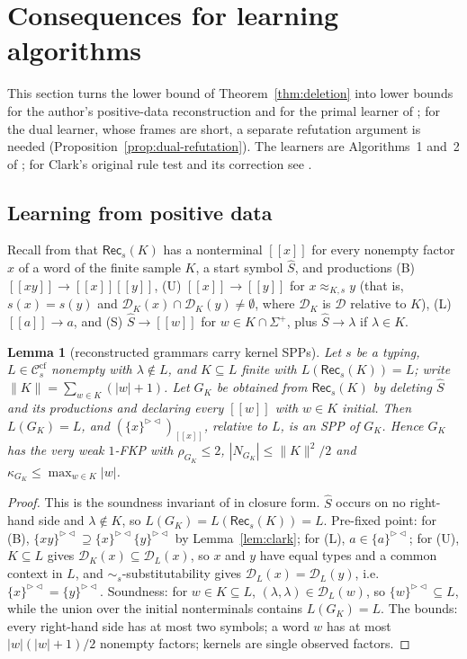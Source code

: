 \documentclass[11pt]{article}
\numberwithin{equation}{section}
\theoremstyle{plain}
\newtheorem{lemma}[theorem]{Lemma}
\theoremstyle{definition}
\theoremstyle{remark}
\theoremstyle{plain}
\newcommand{\eps}{\lambda}
\newcommand{\RL}{^{\rhd\lhd}}
\newcommand{\D}{\mathcal D}
\newcommand{\Ccf}[1]{\mathcal C^{\mathrm{cf}}_{#1}}
\begin{document}
\section{Consequences for learning algorithms}\label{sec:applications}

This section turns the lower bound of Theorem~\ref{thm:deletion} into lower
bounds for the author's positive-data reconstruction and for the primal
learner of \citet{ky2017}; for the dual learner, whose frames are short, a
separate refutation argument is needed (Proposition~\ref{prop:dual-refutation}).
The learners are Algorithms~1 and~2 of \citet{ky2017}; for Clark's original
rule test and its correction see \citet{leiss2014}.

\subsection*{Learning from positive data}

Recall from \citet[Sec.~4.1]{kuriyama-tcs1}
that $\mathsf{Rec}_s(K)$ has a nonterminal $[\![x]\!]$ for every nonempty
factor $x$ of a word of the finite sample $K$, a start symbol $\widehat S$,
and productions
(B) $[\![xy]\!]\to[\![x]\!][\![y]\!]$,
(U) $[\![x]\!]\to[\![y]\!]$ for $x\approx_{K,s}y$ (that is, $s(x)=s(y)$ and
$\D_K(x)\cap\D_K(y)\ne\emptyset$, where $\D_K$ is $\D$ relative to $K$),
(L) $[\![a]\!]\to a$, and
(S) $\widehat S\to[\![w]\!]$ for $w\in K\cap\Sigma^+$, plus
$\widehat S\to\eps$ if $\eps\in K$.

\begin{lemma}[reconstructed grammars carry kernel SPPs]\label{lem:rec-kernel}
Let $s$ be a typing, $L\in\Ccf s$ nonempty with $\eps\notin L$, and
$K\subseteq L$ finite with $L(\mathsf{Rec}_s(K))=L$; write
$\|K\|=\sum_{w\in K}(|w|+1)$.  Let $G_K$ be obtained from
$\mathsf{Rec}_s(K)$ by deleting $\widehat S$ and its productions and
declaring every $[\![w]\!]$ with $w\in K$ initial.  Then $L(G_K)=L$, and
$(\{x\}\RL)_{[\![x]\!]}$, relative to $L$, is an SPP of $G_K$.  Hence $G_K$
has the very weak $1$-FKP with $\rho_{G_K}\le2$,
$|N_{G_K}|\le\|K\|^2/2$ and $\kappa_{G_K}\le\max_{w\in K}|w|$.
\end{lemma}
\begin{proof}
This is the soundness invariant of \citet[Thm.~4.2]{kuriyama-tcs1} in
closure form.  $\widehat S$ occurs on no right-hand side and $\eps\notin K$, so
$L(G_K)=L(\mathsf{Rec}_s(K))=L$.  Pre-fixed point: for (B),
$\{xy\}\RL\supseteq\{x\}\RL\{y\}\RL$ by Lemma~\ref{lem:clark}; for (L),
$a\in\{a\}\RL$; for (U), $K\subseteq L$ gives $\D_K(x)\subseteq\D_L(x)$, so
$x$ and $y$ have equal types and a common context in $L$, and
$\sim_s$-substitutability gives $\D_L(x)=\D_L(y)$, i.e.\
$\{x\}\RL=\{y\}\RL$.  Soundness: for $w\in K\subseteq L$,
$(\eps,\eps)\in\D_L(w)$, so $\{w\}\RL\subseteq L$, while the union over the
initial nonterminals contains $L(G_K)=L$.  The bounds: every right-hand
side has at most two symbols; a word $w$ has at most $|w|(|w|+1)/2$
nonempty factors; kernels are single observed factors.
\end{proof}
\end{document}
